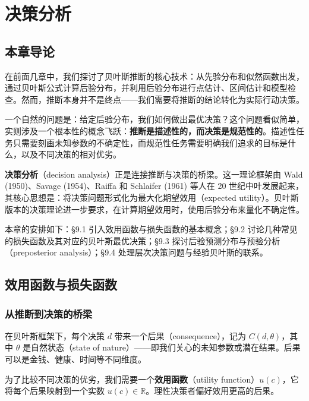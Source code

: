 
\chapter{决策分析}

\section{本章导论}

在前面几章中，我们探讨了贝叶斯推断的核心技术：从先验分布和似然函数出发，通过贝叶斯公式计算后验分布，并利用后验分布进行点估计、区间估计和模型检查。然而，推断本身并不是终点——我们需要将推断的结论转化为实际行动决策。

一个自然的问题是：给定后验分布，我们如何做出最优决策？这个问题看似简单，实则涉及一个根本性的概念飞跃：\textbf{推断是描述性的，而决策是规范性的}。描述性任务只需要刻画未知参数的不确定性，而规范性任务需要明确我们追求的目标是什么，以及不同决策的相对优劣。

\textbf{决策分析}（decision analysis）正是连接推断与决策的桥梁。这一理论框架由 Wald (1950)、Savage (1954)、Raiffa 和 Schlaifer (1961) 等人在 20 世纪中叶发展起来，其核心思想是：将决策问题形式化为最大化期望效用（expected utility）。贝叶斯版本的决策理论进一步要求，在计算期望效用时，使用后验分布来量化不确定性。

本章的安排如下：\S 9.1 引入效用函数与损失函数的基本概念；\S 9.2 讨论几种常见的损失函数及其对应的贝叶斯最优决策；\S 9.3 探讨后验预测分布与预验分析（preposterior analysis）；\S 9.4 处理层次决策问题与经验贝叶斯的联系。

\section{效用函数与损失函数}

\subsection{从推断到决策的桥梁}

在贝叶斯框架下，每个决策 $d$ 带来一个后果（consequence），记为 $C(d, \theta)$，其中 $\theta$ 是自然状态（state of nature）——即我们关心的未知参数或潜在结果。后果可以是金钱、健康、时间等不同维度。

为了比较不同决策的优劣，我们需要一个\textbf{效用函数}（utility function）$u(c)$，它将每个后果映射到一个实数 $u(c) \in \mathbb{R}$。理性决策者偏好效用更高的后果。

